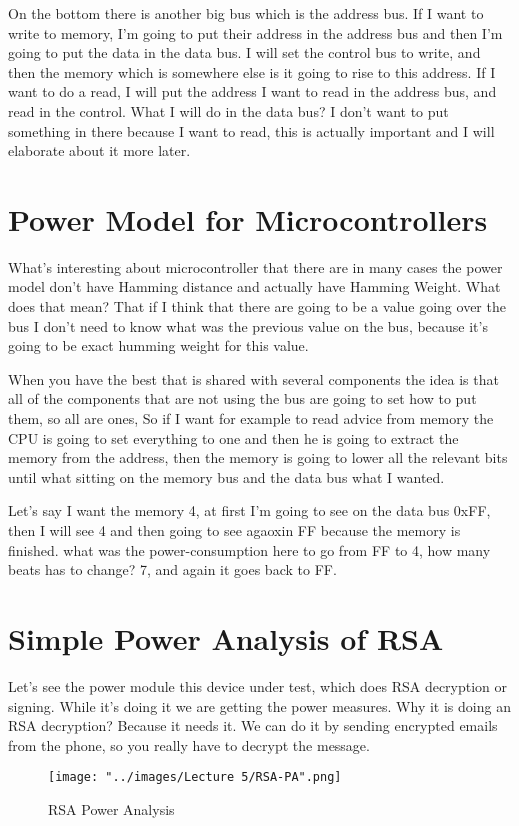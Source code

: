\documentclass{report}
\begin{document}
On the bottom there is another big bus which is the address bus. If I want to write to memory, I'm going to put their address in the address bus and then I'm going to put the data in the data bus. I will set the control bus to write, and then the memory which is somewhere else is it going to rise to this address. If I want to do a read, I will put the address I want to read in the address bus, and read in the control. What I will do in the data bus? I don't want to put something in there because I want to read, this is actually important and I will elaborate about it more later.

\section{Power Model for Microcontrollers}
What's interesting about microcontroller that there are in many cases the power model don't have Hamming distance and actually have Hamming Weight. What does that mean? That if I think that there are going to be a value going over the bus I don't need to know what was the previous value on the bus, because it's going to be exact humming weight for this value. 

When you have the best that is shared with several components the idea is that all of the components that are not using the bus are going to set how to put them, so all are ones, So if I want for example to read advice from memory the CPU is going to set everything to one and then he is going to extract the memory from the address, then the memory is going to lower all the relevant bits until what sitting on the memory bus and the data bus what I wanted. 

Let's say I want the memory 4, at first I'm going to see on the data bus 0xFF, then I will see 4 and then going to see agaoxin FF because the memory is finished. what was the power-consumption here to go from FF to 4, how many beats has to change? 7, and again it goes back to FF.

\section{Simple Power Analysis of RSA}
Let's see the power module this device under test, which does RSA decryption or signing. While it's doing it we are getting the power measures. Why it is doing an RSA decryption? Because it needs it. We can do it by sending encrypted emails from the phone, so you really have to decrypt the message.

\begin{figure}[htp]
\centering
\hspace*{-0.5in}
\texttt{[image: "../images/Lecture 5/RSA-PA".png]}
\caption{RSA Power Analysis}
\label{}
\end{figure}
\end{document}
